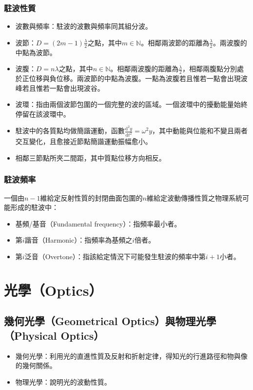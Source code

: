\documentclass[a4paper,12pt]{report}
\begin{document}
\subsubsection{駐波性質}
\begin{itemize}
\item 波數與頻率：駐波的波數與頻率同其組分波。
\item 波節：$D=(2m-1)\frac{\lambda}{2}$之點，其中$m\in\mathbb{N}$。相鄰兩波節的距離為$\frac{\lambda}{2}$。兩波腹的中點為波節。
\item 波腹：$D=n\lambda$之點，其中$n\in\mathbb{N}$。相鄰兩波腹的距離為$\frac{\lambda}{2}$，相鄰兩腹點分別處於正位移與負位移。兩波節的中點為波腹。一點為波腹若且惟若一點會出現波峰若且惟若一點會出現波谷。
\item 波環：指由兩個波節包圍的一個完整的波的區域。一個波環中的擾動能量始終停留在該波環中。
\item 駐波中的各質點均做簡諧運動，函數$\frac{\mathrm{d}^2y}{\mathrm{d}t^2}=\omega^2y$，其中動能與位能和不變且兩者交互變化，且愈接近節點簡諧運動振幅愈小。
\item 相鄰三節點所夾二間距，其中質點位移方向相反。
\end{itemize}
\subsubsection{駐波頻率}
一個由$n-1$維給定反射性質的封閉曲面包圍的$n$維給定波動傳播性質之物理系統可能形成的駐波中：
\begin{itemize}
\item 基頻/基音（Fundamental frequency）：指頻率最小者。
\item 第$i$諧音（Harmonic）：指頻率為基頻之$i$倍者。
\item 第$i$泛音（Overtone）：指該給定情況下可能發生駐波的頻率中第$i+1$小者。
\end{itemize}


\section{光學（Optics）}
\subsection{幾何光學（Geometrical Optics）與物理光學（Physical Optics）}
\begin{itemize}
\item 幾何光學：利用光的直進性質及反射和折射定律，得知光的行進路徑和物與像的幾何關係。
\item 物理光學：說明光的波動性質。
\end{itemize}
\end{document}
